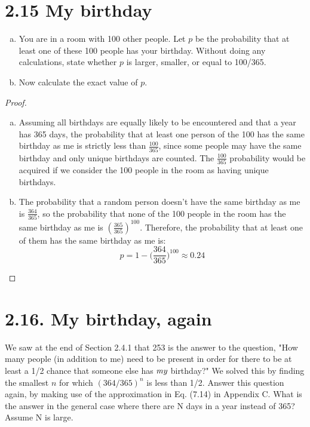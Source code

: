 \section*{2.15 My birthday}
\begin{enumerate}[(a)]
    \item You are in a room with 100 other people. Let $p$ be the probability that at least one
        of these 100 people has your birthday. Without doing any calculations, state whether $p$ 
        is larger, smaller, or equal to 100/365.

    \item Now calculate the exact value of $p$.
\end{enumerate}

\begin{proof}
    \hfill
    \begin{enumerate}[(a)]
        \item Assuming all birthdays are equally likely to be encountered and that a year has 365 days,
            the probability that at least one person of the 100 has the same birthday as me is strictly less
            than $\frac{100}{365}$, since some people may have the same birthday and only unique
            birthdays are counted. The $\frac{100}{365}$ probability would be acquired if we consider 
            the 100 people in the room as having unique birthdays.

        \item The probability that a random person doesn't have the same birthday as me is $\frac{364}{365}$,
            so the probability that none of the 100 people in the room has the same birthday as me is
            $(\frac{365}{365})^{100}$. Therefore, the probability that at least one of them has the 
            same birthday as me is:
            \[
                p = 1 - \bigg(\frac{364}{365}\bigg)^{100} \approx 0.24
            \] 
    \end{enumerate}
\end{proof}

\section*{2.16. My birthday, again}
We saw at the end of Section 2.4.1 that 253 is the answer to the question, "How many people (in addition to
me) need to be present in order for there to be at least a 1/2 chance that someone else has $\emph{my}$ 
birthday?" We solved this by finding the smallest $n$ for which $(364/365)^n$ is less than 1/2. Answer
this question again, by making use of the approximation in Eq. (7.14) in Appendix C. What is the answer
in the general case where there are N days in a year instead of 365? Assume N is large.

